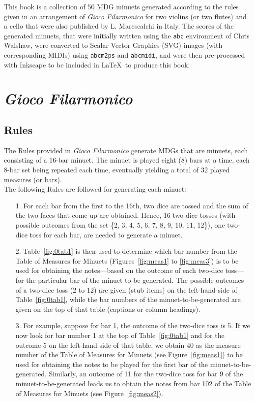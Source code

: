 \documentclass[a4paper,x11names,svgnames,10pt]{article}
\begin{document}
{This book is a collection of 50 MDG minuets generated according to the rules given in an arrangement of {\it Gioco Filarmonico} for two violins (or two flutes) and a cello that were also published by L. Marescalchi in Italy.  The scores of the generated minuets, that were initially written using the \texttt{abc} environment of Chris Walshaw, were converted to Scalar Vector Graphics (SVG) images (with corresponding MIDIs) using {\tt abcm2ps} and {\tt abcmidi}, and were then pre-processed with Inkscape to be included in \LaTeX\ to produce this book.


\section{\em Gioco Filarmonico}

\subsection{Rules}

The Rules provided in {\em Gioco Filarmonico} generate MDGs that are minuets, each consisting of a 16-bar minuet.  The minuet is played eight (8) bars at a time, each 8-bar set being repeated each time, eventually yielding a total of 32 played measures (or bars). \\

The following Rules are followed for generating each minuet:
\begin{enumerate}
	\item [1.] For each bar from the first to the 16th, two dice are tossed and the sum of the two faces that come up are obtained.  Hence, 16 two-dice tosses (with possible outcomes from the set \{2, 3, 4, 5, 6, 7, 8, 9, 10, 11, 12\}), one two-dice toss for each bar, are needed to generate a minuet.   
	\item [2.] Table~\ref{fig:0tab1} is then used to determine which bar number from the Table of Measures for Minuets (Figures~\ref{fig:meas1} to \ref{fig:meas3}) is to be used for obtaining the notes---based on the outcome of each two-dice toss---for the particular bar of the minuet-to-be-generated.  The possible outcomes of a two-dice toss (2 to 12) are given (stub items) on the left-hand side of Table~\ref{fig:0tab1}, while the bar numbers of the minuet-to-be-generated are given on the top of that table (captions or column  headings).
	\item [3.]  For example, suppose for bar 1, the outcome of the two-dice toss is 5.  If we now look for bar number 1 at the top of Table~\ref{fig:0tab1} and for the outcome 5 on the left-hand side of that table, we obtain 40 as the measure number of the Table of Measures for Minuets (see Figure~\ref{fig:meas1}) to be used for obtaining the notes to be played for the first bar of the minuet-to-be-generated.  Similarly, an outcome of 11 for the two-dice toss for bar 9 of the minuet-to-be-generated leads us to obtain the notes from bar 102 of the Table of Measures for Minuets (see Figure~\ref{fig:meas2}).
\end{enumerate}   


}
\end{document}
